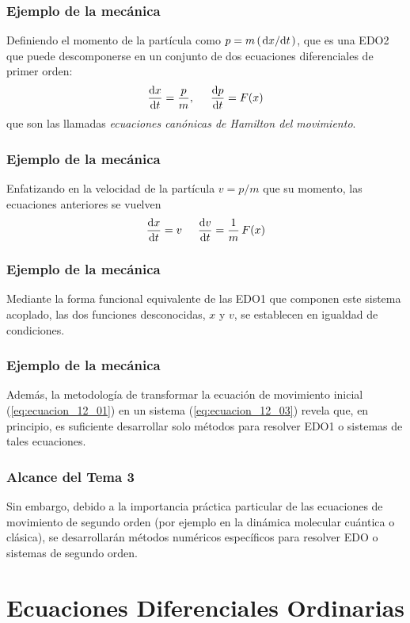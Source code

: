 \begin{frame}
\frametitle{Ejemplo de la mecánica}
Definiendo el momento de la partícula como $p = m \, (\dv*{x}{t})$, que es una EDO2 que puede descomponerse en un conjunto de dos ecuaciones diferenciales de primer orden:
\begin{align}
\dv{x}{t} = \dfrac{p}{m}, \hspace{0.5cm} \dv{p}{t} = F(x)
\label{eq:ecuacion_12_02}
\end{align}
que son las llamadas \emph{ecuaciones canónicas de Hamilton del movimiento}.
\end{frame}
\begin{frame}
\frametitle{Ejemplo de la mecánica}
Enfatizando en la velocidad de la partícula $v=p/m$ que su momento, las ecuaciones anteriores se vuelven
\begin{align}
\dv{x}{t} = v \hspace{0.5cm} \dv{v}{t} = \dfrac{1}{m} \, F(x)
\label{eq:ecuacion_12_03}
\end{align}
\end{frame}
\begin{frame}
\frametitle{Ejemplo de la mecánica}
Mediante la forma funcional equivalente de las EDO1 que componen este sistema acoplado, las dos funciones desconocidas, $x$ y $v$, se establecen en igualdad de condiciones.
\end{frame}
\begin{frame}
\frametitle{Ejemplo de la mecánica}
Además, la metodología de transformar la ecuación de movimiento inicial (\ref{eq:ecuacion_12_01}) en un sistema (\ref{eq:ecuacion_12_03}) revela que, en principio, es suficiente desarrollar solo métodos para resolver EDO1 o sistemas de tales ecuaciones.
\end{frame}
\begin{frame}
\frametitle{Alcance del Tema 3}
Sin embargo, debido a la importancia práctica particular de las ecuaciones de movimiento de segundo orden (por ejemplo en la dinámica molecular cuántica o clásica), se desarrollarán métodos numéricos específicos para resolver EDO o sistemas de segundo orden.
\end{frame}
\section{Ecuaciones Diferenciales Ordinarias}
